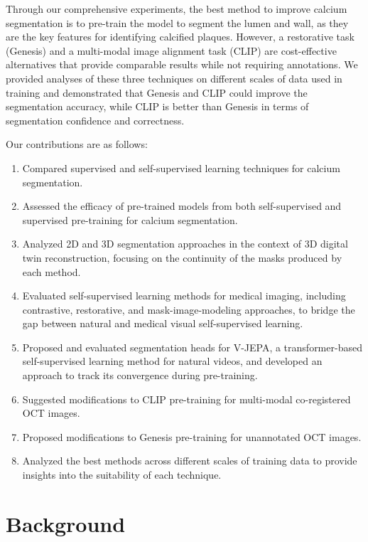 \documentclass[a4paper,11pt,oneside]{report}
\begin{document}
Through our comprehensive experiments, the best method to improve calcium segmentation is to pre-train the model to segment the lumen and wall, as they are the key features for identifying calcified plaques. However, a restorative task (Genesis) and a multi-modal image alignment task (CLIP) are cost-effective alternatives that provide comparable results while not requiring annotations. We provided analyses of these three techniques on different scales of data used in training and demonstrated that Genesis and CLIP could improve the segmentation accuracy, while CLIP is better than Genesis in terms of segmentation confidence and correctness.

Our contributions are as follows:
\begin{enumerate}
    \item Compared supervised and self-supervised learning techniques for calcium segmentation.
    \item Assessed the efficacy of pre-trained models from both self-supervised and supervised pre-training for calcium segmentation. 
    \item Analyzed 2D and 3D segmentation approaches in the context of 3D digital twin reconstruction, focusing on the continuity of the masks produced by each method.
    \item Evaluated self-supervised learning methods for medical imaging, including contrastive, restorative, and mask-image-modeling approaches, to bridge the gap between natural and medical visual self-supervised learning.
    \item Proposed and evaluated segmentation heads for V-JEPA, a transformer-based self-supervised learning method for natural videos, and developed an approach to track its convergence during pre-training.
    \item Suggested modifications to CLIP pre-training for multi-modal co-registered OCT images.
    \item Proposed modifications to Genesis pre-training for unannotated OCT images. 
    \item Analyzed the best methods across different scales of training data to provide insights into the suitability of each technique.
\end{enumerate}

\chapter{Background}
\end{document}
